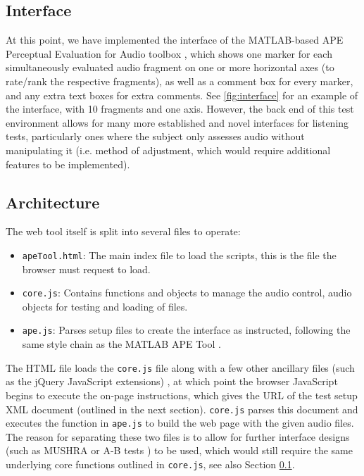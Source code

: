 \documentclass{article}
\begin{document}
\subsection{Interface}\label{sec:interface} %

At this point, we have implemented the interface of the MATLAB-based APE Perceptual Evaluation for Audio toolbox \cite{deman2014b}, which shows one marker for each simultaneously evaluated audio fragment on one or more horizontal axes (to rate/rank the respective fragments), as well as a comment box for every marker, and any extra text boxes for extra comments. See \ref{fig:interface} for an example of the interface, with 10 fragments and one axis. However, the back end of this test environment allows for many more established and novel interfaces for listening tests, particularly ones where the subject only assesses audio without manipulating it (i.e. method of adjustment, which would require additional features to be implemented). 




\subsection{Architecture}\label{sec:architecture}

The web tool itself is split into several files to operate:
\begin{itemize}
\item \texttt{apeTool.html}: The main index file to load the scripts, this is the file the browser must request to load. %
\item \texttt{core.js}: Contains functions and objects to manage the audio control, audio objects for testing and loading of files. 
\item \texttt{ape.js}: Parses setup files to create the interface as instructed, following the same style chain as the MATLAB APE Tool \cite{deman2014b}.
\end{itemize}

The HTML file loads the \texttt{core.js} file along with a few other ancillary files (such as the jQuery JavaScript extensions)%
, at which point the browser JavaScript begins to execute the on-page instructions, which gives the URL of the test setup XML document (outlined in the next section). \texttt{core.js} parses this document and executes the function in \texttt{ape.js} to build the web page with the given audio files. The reason for separating these two files is to allow for further interface designs (such as MUSHRA \cite{mushra} or A-B tests \cite{bech}) to be used, which would still require the same underlying core functions outlined in \texttt{core.js}, see also Section \ref{sec:interface}.
\end{document}
